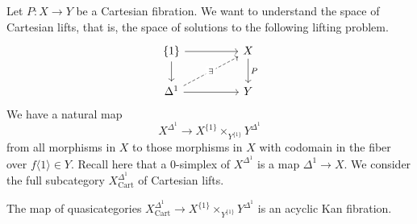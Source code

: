 Let $P:X\to Y$ be a Cartesian fibration. We want to understand the space of Cartesian lifts, that is, the space of solutions to the following lifting problem. 
$$%
\begin{tikzcd}
	{\{1\}} && X \\
	{\Delta^{1}} && Y
	\arrow["P", from=1-3, to=2-3]
	\arrow[from=1-1, to=1-3]
	\arrow[from=2-1, to=2-3]
	\arrow[from=1-1, to=2-1]
	\arrow["\exists"{description}, dashed, from=2-1, to=1-3]
\end{tikzcd}$$
We have a natural map 
$$X^{\Delta^{1}}\to X^{\{1\}}\times_{Y^{\{1\}}}Y^{\Delta^{1}}$$
from all morphisms in $X$ to those morphisms in $X$ with codomain in the fiber over $f\langle 1\rangle\in Y$. Recall here that a 0-simplex of $X^{\Delta^{1}}$ is a map $\Delta^{1}\to X$. We consider the full subcategory $X_{\mathrm{Cart}}^{\Delta^{1}}$ of Cartesian lifts. 
\begin{proposition}
    The map of quasicategories $X^{\Delta^{1}}_{\mathrm{Cart}}\to X^{\{1\}}\times_{Y^{\{1\}}}Y^{\Delta^{1}}$ is an acyclic Kan fibration. 
\end{proposition}
